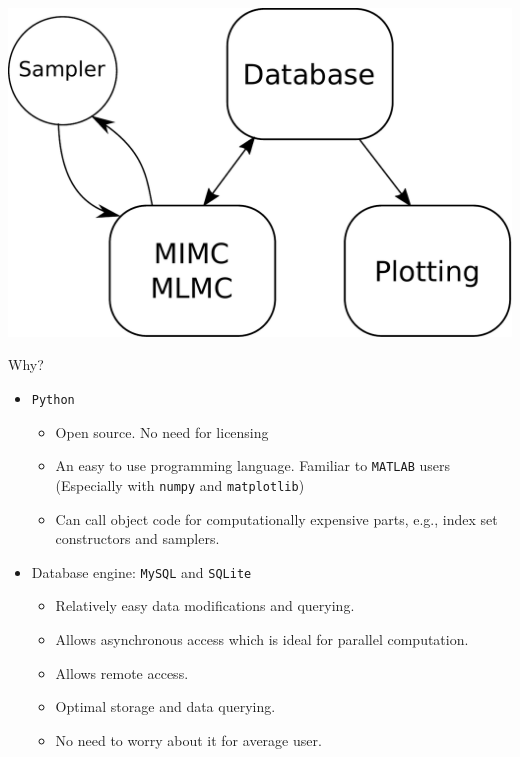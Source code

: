 \begin{frame}
\centering
\includegraphics[scale=0.4]{src/imgs/scheme}
\end{frame}

\begin{frame}{Why?}
  \begin{itemize}
  \item \texttt{Python}
    \begin{itemize}
    \item Open source. No need for licensing
    \item An easy to use programming language. Familiar to
      \texttt{MATLAB} users (Especially with \texttt{numpy} and \texttt{matplotlib})
    \item Can call object code for computationally expensive parts,
      e.g., index set constructors and samplers.
    \end{itemize}
    \item Database engine: \texttt{MySQL} and \texttt{SQLite}
      \begin{itemize}
      \item Relatively easy data modifications and querying.
      \item Allows asynchronous access which is ideal for parallel computation.
      \item Allows remote access.
      \item Optimal storage and data querying.
      \item No need to worry about it for average user.
      \end{itemize}
    \end{itemize}
\end{frame}

